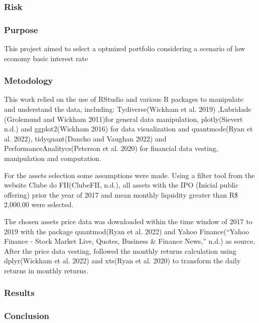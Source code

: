 \documentclass[
  letterpaper,
  DIV=11,
  numbers=noendperiod]{scrartcl}
\begin{document}
\hypertarget{risk}{%
\subsubsection{Risk}\label{risk}}

\hypertarget{purpose}{%
\subsubsection{Purpose}\label{purpose}}

This project aimed to select a optmized portfolio considering a scenario
of low economy basic interest rate

\hypertarget{metodology}{%
\subsubsection{Metodology}\label{metodology}}

This work relied on the use of RStudio and various R packages to
manipulate and understand the data, including: Tydiverse(Wickham et al.
2019) ,Lubridade (Grolemund and Wickham 2011)for general data
manipulation, plotly(Sievert n.d.) and ggplot2(Wickham 2016) for data
visualization and quantmode(Ryan et al. 2022), tidyquant(Dancho and
Vaughan 2022) and PerformanceAnalitycs(Peterson et al. 2020) for
financial data vesting, manipulation and computation.

For the assets selection some assumptions were made. Using a filter tool
from the website Clube do FII(ClubeFII, n.d.), all assets with the IPO
(Inicial public offering) prior the year of 2017 and mean monthly
liquidity greater than R\$ 2,000.00 were selected.

The chosen assets price data was downloaded within the time window of
2017 to 2019 with the package quantmod(Ryan et al. 2022) and Yahoo
Finance({``Yahoo Finance - Stock Market Live, Quotes, Business \&
Finance News,''} n.d.) as source. After the price data vesting, followed
the monthly returns calculation using dplyr(Wickham et al. 2022) and
xts(Ryan et al. 2020) to transform the daily returns in monthly returns.

\hypertarget{results}{%
\subsubsection{Results}\label{results}}

\hypertarget{conclusion}{%
\subsubsection*{Conclusion}\label{conclusion}}
\end{document}
